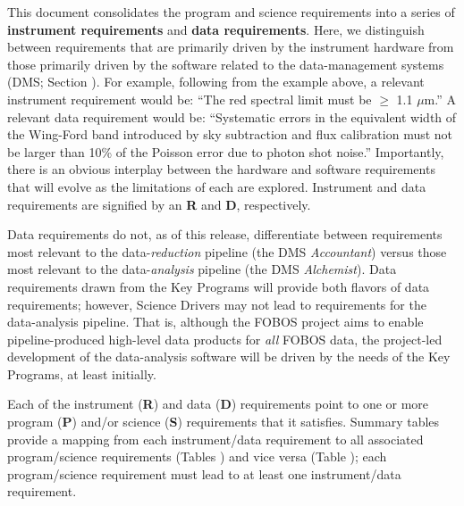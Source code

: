 \documentclass[11pt,a4paper,twoside,onecolumn,openany,final,oldfontcommands]{memoir}
\begin{document}
This document consolidates the program and science requirements into a series of {\bf instrument requirements} and {\bf data requirements}.  Here, we distinguish between requirements that are primarily driven by the instrument hardware from those primarily driven by the software related to the data-management systems (DMS; Section ).    For example, following from the example above, a relevant instrument requirement would be: ``The red spectral limit must be $\geq$ 1.1 $\mu$m.''  A relevant data requirement would be: ``Systematic errors in the equivalent width of the Wing-Ford band introduced by sky subtraction and flux calibration must not be larger than 10\% of the Poisson error due to photon shot noise.''  Importantly, there is an obvious interplay between the hardware and software requirements that will evolve as the limitations of each are explored. Instrument and data requirements are signified by an {\bf R} and {\bf D}, respectively.

Data requirements do not, as of this release, differentiate between requirements most relevant to the data-{\it reduction} pipeline (the DMS {\it Accountant}) versus those most relevant to the data-{\it analysis} pipeline (the DMS {\it Alchemist}).  Data requirements drawn from the Key Programs will provide both flavors of data requirements; however, Science Drivers may not lead to requirements for the data-analysis pipeline.  That is, although the FOBOS project aims to enable pipeline-produced high-level data products for {\it all} FOBOS data, the project-led development of the data-analysis software will be driven by the needs of the Key Programs, at least initially.

Each of the instrument ({\bf R}) and data ({\bf D}) requirements point to one or more program ({\bf P}) and/or science ({\bf S}) requirements that it satisfies.  Summary tables provide a mapping from each instrument/data requirement to all associated program/science requirements (Tables ) and vice versa (Table ); each program/science requirement must lead to at least one instrument/data requirement.

\end{document}
